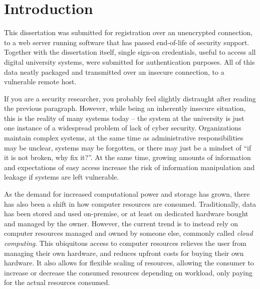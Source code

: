 \chapter{Introduction}

This dissertation was submitted for registration over an unencrypted connection, to a web server running software that has passed end-of-life of security support.
Together with the dissertation itself, single sign-on credentials, useful to access all digital university systems, were submitted for authentication purposes.
All of this data neatly packaged and transmitted over an insecure connection, to a vulnerable remote host.

If you are a security researcher, you probably feel slightly distraught after reading the previous paragraph.
However, while being an inherently insecure situation, this is the reality of many systems today -- the system at the university is just one instance of a widespread problem of lack of cyber security.
Organizations maintain complex systems, at the same time as administrative responsibilities may be unclear, systems may be forgotten, or there may just be a mindset of ``if it is not broken, why fix it?''.
At the same time, 
growing amounts of information and expectations of easy access increase the risk of information manipulation and leakage if systems are left vulnerable.

As the demand for increased computational power and storage has grown, there has also been a shift in how computer resources are consumed.
Traditionally, data has been stored and used on-premise, or at least on dedicated hardware bought and managed by the owner.
However, the current trend is to instead rely on computer resources managed and owned by someone else, commonly called \emph{cloud computing}.
This ubiquitous access to computer resources relieves the user from managing their own hardware, and reduces upfront costs for buying their own hardware.
It also allows for flexible scaling of resources, allowing the consumer to increase or decrease the consumed resources depending on workload, only paying for the actual resources consumed.


